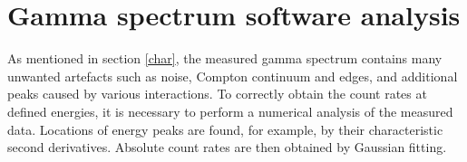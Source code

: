 \chapter{Gamma spectrum software analysis}
As mentioned in section \ref{char}, the measured gamma spectrum contains many unwanted artefacts such as noise, Compton continuum and edges, and additional peaks caused by various interactions. To correctly obtain the count rates at defined energies, it is necessary to perform a numerical analysis of the measured data. Locations of energy peaks are found, for example, by their characteristic second derivatives. Absolute count rates are then obtained by Gaussian fitting.


